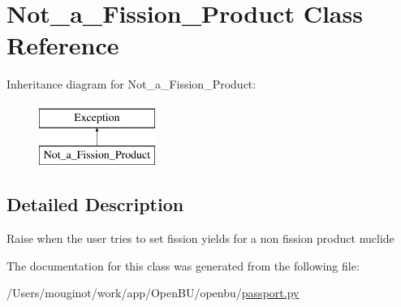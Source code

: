 \hypertarget{classopenbu_1_1passport_1_1_not__a___fission___product}{}\section{Not\+\_\+a\+\_\+\+Fission\+\_\+\+Product Class Reference}
\label{classopenbu_1_1passport_1_1_not__a___fission___product}
Inheritance diagram for Not\+\_\+a\+\_\+\+Fission\+\_\+\+Product\+:\begin{figure}[H]
\begin{center}
\leavevmode
\includegraphics[height=2.000000cm]{classopenbu_1_1passport_1_1_not__a___fission___product}
\end{center}
\end{figure}


\subsection{Detailed Description}
\begin{DoxyVerb}Raise when the user tries to set fission yields for a non fission product nuclide \end{DoxyVerb}
 

The documentation for this class was generated from the following file\+:\begin{DoxyCompactItemize}
\item 
/\+Users/mouginot/work/app/\+Open\+B\+U/openbu/\mbox{\hyperlink{passport_8py}{passport.\+py}}\end{DoxyCompactItemize}
